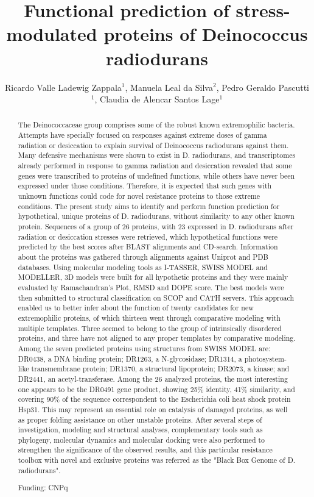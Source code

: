 \documentclass[twoside]{article}
\title{\vspace{-15mm}\fontsize{24pt}{10pt}\selectfont\textbf{Functional prediction of stress-modulated proteins of Deinococcus radiodurans}} %
\author{Ricardo Valle Ladewig Zappala$^1$, Manuela Leal da Silva$^2$, Pedro Geraldo Pascutti$^1$, Claudia de Alencar Santos Lage$^1$}
\affil{1 UNIVERSIDADE FEDERAL DO RIO DE JANEIRO\\ 2 INSTITUTO NACIONAL DE METROLOGIA, QUALIDADE E TECNOLOGIA\\ }
\date{}
\begin{document}
\maketitle %

\thispagestyle{fancy} %


\begin{abstract}
The Deinococcaceae group comprises some of the robust known extremophilic bacteria. Attempts have specially focused on responses against extreme doses of gamma radiation or desiccation to explain survival of Deinococcus radiodurans against them. Many defensive mechanisms were shown to exist in D. radiodurans, and transcriptomes already performed in response to gamma radiation and desiccation revealed that some genes were transcribed to proteins of undefined functions, while others have never been expressed under those conditions. Therefore, it is expected that such genes with unknown functions could code for novel resistance proteins to those extreme conditions. The present study aims to identify and perform function prediction for hypothetical, unique proteins of D. radiodurans, without similarity to any other known protein. Sequences of a group of 26 proteins, with 23 expressed in D. radiodurans after radiation or desiccation stresses were retrieved, which hypothetical functions were predicted by the best scores after BLAST alignments and CD-search. Information about the proteins was gathered through alignments against Uniprot and PDB databases. Using molecular modeling tools as I-TASSER, SWISS MODEL and MODELLER, 3D models were built for all hypothetic proteins and they were mainly evaluated by Ramachandran's Plot, RMSD and DOPE score. The best models were then submitted to structural classification on SCOP and CATH servers. This approach enabled us to better infer about the function of twenty candidates for new extremophilic proteins, of which thirteen went through comparative modeling with multiple templates. Three seemed to belong to the group of intrinsically disordered proteins, and three have not aligned to any proper templates by comparative modeling. Among the seven predicted proteins using structures from SWISS MODEL are: DR0438, a DNA binding protein; DR1263, a N-glycosidase; DR1314, a photosystem-like transmembrane protein; DR1370, a structural lipoprotein; DR2073, a kinase; and DR2441, an acetyl-transferase. Among the 26 analyzed proteins, the most interesting one appears to be the DR0491 gene product, showing 25\% identity, 41\% similarity, and covering 90\% of the sequence correspondent to the Escherichia coli heat shock protein Hsp31. This may represent an essential role on catalysis of damaged proteins, as well as proper folding assistance on other unstable proteins. After several steps of investigation, modeling and structural analyses, complementary tools such as phylogeny, molecular dynamics and molecular docking were also performed to strengthen the significance of the observed results, and this particular resistance toolbox with novel and exclusive proteins was referred as the "Black Box Genome of D. radiodurans".

Funding: CNPq
\end{abstract}
\end{document}
